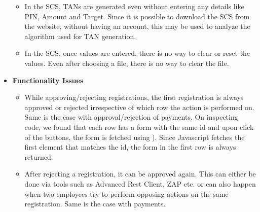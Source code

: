 \begin{itemize}
\begin{itemize}
            \item In the SCS, TANs are generated even without entering any details like PIN, Amount and Target. Since it is possible to download the SCS from the website, without having an account, this may be used to analyze the algorithm used for TAN generation.
            \item In the SCS, once values are entered, there is no way to clear or reset the values. Even after choosing a file, there is no way to clear the file.
        \end{itemize}
    \item \textbf{Functionality Issues}
        \begin{itemize}
            \item While approving/rejecting registrations, the first registration is always approved or rejected irrespective of which row the action is performed on. Same is the case with approval/rejection of payments. On inspecting code, we found that each row has a form with the same id  and upon click of the buttons, the form is fetched using ). Since Javascript fetches the first element that matches the id, the form in the first  row is always returned.
            \item After rejecting a registration, it can be approved again. This can either be done via tools such as Advanced Rest Client, ZAP etc. or can also happen when two employees try to perform opposing actions on the same registration. Same is the case with payments.
        \end{itemize}
\end{itemize}